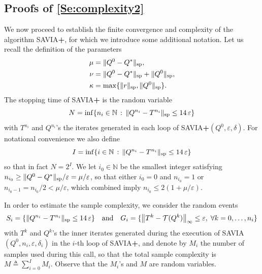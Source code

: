 \documentclass{article}
\newcommand{\T}{\mathcal{T}}
\newcommand{\NN}{\mathbb{N}}
\newcommand*{\infn}[1]{\left\|{#1}\right\|_{\infty}}
\renewcommand{\sp}[1]{\|{#1}\|_\text{\rm sp}}
\newcommand{\R}{r}
\newcommand{\st}{N}
\theoremstyle{plain}
\theoremstyle{definition}
\theoremstyle{remark}
\begin{document}
\subsection{Proofs of \cref{Se:complexity2}}
We now proceed to establish the finite convergence and complexity of the algorithm {\rm SAVIA}\textbf{+}, for which we introduce some additional notation.
Let us recall the definition of the parameters
\vspace{-1ex}
\begin{align*}
    \mu&=\sp{Q^0-Q^*},\\
    \nu&=\sp{Q^0-Q^*}+\sp{Q^0},\\
    \kappa&=\max\{\sp{\R},\sp{Q^0}\}.
\end{align*}
The stopping time of \mbox{\rm SAVIA\textbf{+}} is the random variable 
$$
 \st =\inf\{{ n_i \in \mathbb N \,:\, \sp{Q^{n_i}-T^{n_i}} \le 14\,\varepsilon}\}
$$
with $T^{n_i}$ and $Q^{n_i}$'s the iterates generated in each loop of \mbox{\rm SAVIA\textbf{+}}$(Q^0,\varepsilon,\delta)$.
For notational convenience we also define 
\begin{equation*}
 I =\inf\{ i \in \mathbb N \,:\, \sp{Q^{n_i}-T^{n_i}} \le 14\,\varepsilon\}
\end{equation*}
so that in fact $N=2^I$. We let $i_0 \in \NN$ be the smallest integer satisfying $n_{i_0}\ge\sp{Q^0-Q^{*}}/\varepsilon=\mu/\varepsilon$, so that 
either $i_0=0$ and $n_{i_0}=1$ or $n_{i_0-1}=n_{i_0}/2<\mu/\varepsilon$, which combined imply $n_{i_0}\le 2(1+\mu/\varepsilon)$.

In order to estimate the sample complexity,
 we consider the random events
    \begin{equation*}
S_{i}=\{\sp{Q^{n_i}-T^{n_i}} \le 14\,\varepsilon\} \quad \text{and} \quad G_i=\{ \infn{T^k-\T (Q^k)} \le \varepsilon,\;\forall k=0,\ldots,n_i\}
\end{equation*}
with $T^{k}$ and $Q^{k}$'s the inner iterates generated during the execution of \mbox{\rm SAVIA}$(Q^0,n_i,\varepsilon,\delta_i)$ in the $i$-th loop of  \mbox{\rm SAVIA\textbf{+}}, and denote by $M_i$ the number of 
samples used during this call, so that the total sample complexity is $M\triangleq\sum^{I}_{i=0}M_i$. Observe that the $M_i$'s and $M$ are  random variables.
\end{document}
